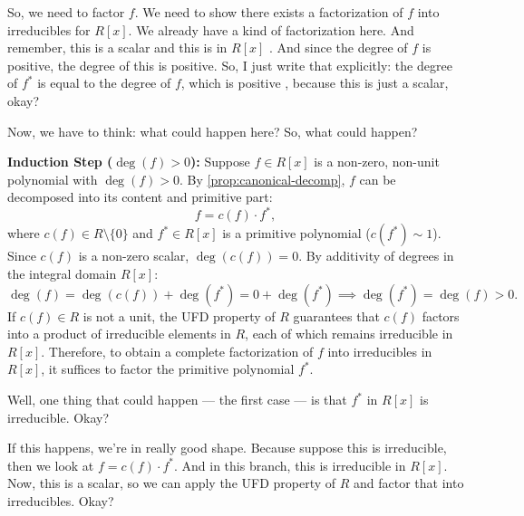 \begin{proofWrapper}
\begin{speech}[00:23:58 - 00:25:57]
So, we need to factor $f$. We need to show there exists a factorization of $f$ into irreducibles for $R[x]$. We already have a kind of factorization here. And remember, this is a scalar  and this is in $R[x]$ . And since the degree of $f$ is positive, the degree of this is positive. So, I just write that explicitly: the degree of $f^*$ is equal to the degree of $f$, which is positive , because this is just a scalar, okay?

Now, we have to think: what could happen here? So, what could happen? 
\end{speech}

\begin{content}
\textbf{Induction Step ($\deg(f) > 0$):}
Suppose $f \in R[x]$ is a non-zero, non-unit polynomial with $\deg(f) > 0$.
By \cref{prop:canonical-decomp}, $f$ can be decomposed into its content and primitive part:
\[
f = c(f) \cdot f^*,
\]
where $c(f) \in R \setminus \{0\}$ and $f^* \in R[x]$ is a primitive polynomial ($c(f^*) \sim 1$).
Since $c(f)$ is a non-zero scalar, $\deg(c(f)) = 0$. By additivity of degrees in the integral domain $R[x]$:
\[
\deg(f) = \deg(c(f)) + \deg(f^*) = 0 + \deg(f^*) \implies \deg(f^*) = \deg(f) > 0.
\]
If $c(f) \in R$ is not a unit, the UFD property of $R$ guarantees that $c(f)$ factors into a product of irreducible elements in $R$, each of which remains irreducible in $R[x]$. Therefore, to obtain a complete factorization of $f$ into irreducibles in $R[x]$, it suffices to factor the primitive polynomial $f^*$.
\end{content}

\begin{speech}[00:25:57 - 00:27:36]
Well, one thing that could happen --- the first case --- is that $f^*$ in $R[x]$ is irreducible.  Okay?

If this happens, we're in really good shape. Because suppose this is irreducible, then we look at $f = c(f) \cdot f^*$.  And in this branch, this is irreducible in $R[x]$.  Now, this is a scalar, so we can apply the UFD property of $R$ and factor that into irreducibles.  Okay?


\end{speech}
\end{proofWrapper}
